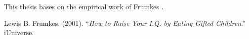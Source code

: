 \documentclass[12pt]{article}
\begin{document}
This thesis bases on the empirical work of Frumkes \cite{brain}.

\begin{thebibliography}{99}
 Lewis B. Frumkes. (2001). ``\textit{How to Raise Your I.Q. by Eating Gifted Children}.'' iUniverse.
\end{thebibliography}
\end{document}
